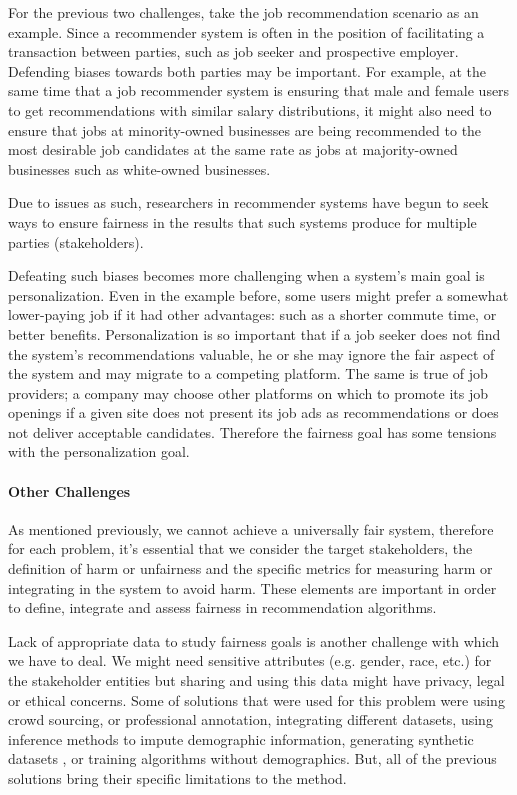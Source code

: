 For the previous two challenges, take the job recommendation scenario as an example. Since a recommender system is often in the position of facilitating a transaction between parties, such as job seeker and prospective employer. Defending biases towards both parties may be important. For example, at the same time that a job recommender system is ensuring that male and female users to get recommendations with similar salary distributions, it might also need to ensure that jobs at minority-owned businesses are being recommended to the most desirable job candidates at the same rate as jobs at majority-owned businesses such as white-owned businesses.

Due to issues as such, researchers in recommender systems have begun to seek ways to ensure fairness in the results that such systems produce for multiple parties (stakeholders).

Defeating such biases becomes more challenging when a system's main goal is personalization. Even in the example before, some users might prefer a somewhat lower-paying job if it had other advantages: such as a shorter commute time, or better benefits. 
Personalization is so important that if a job seeker does not find the system's recommendations valuable, he or she may ignore the fair aspect of the system and may migrate to a competing platform. The same is true of job providers; a company may choose other platforms on which to promote its job openings if a given site does not present its job ads as recommendations or does not deliver acceptable candidates. Therefore the fairness goal has some tensions with the personalization goal.

\paragraph{Other Challenges}

As mentioned previously, we cannot achieve a universally fair system, therefore for each problem, it's essential that we consider the target stakeholders, the definition of harm or unfairness and the specific metrics for measuring harm or integrating in the system to avoid harm. These elements are important in order to define, integrate and assess fairness in recommendation algorithms.

Lack of appropriate data to study fairness goals is another challenge with which we have to deal. We might need sensitive attributes (e.g. gender, race, etc.) for the stakeholder entities but sharing and using this data might have privacy, legal or ethical concerns. Some of solutions that were used for this problem were using crowd sourcing\cite{biega2020overview}, or professional annotation, integrating different datasets, using inference methods to impute demographic information, generating synthetic datasets \cite{burke2018synthetic}, or training algorithms without demographics\cite{Kallus2020Assessing}. But, all of the previous solutions bring their specific limitations to the method. 

